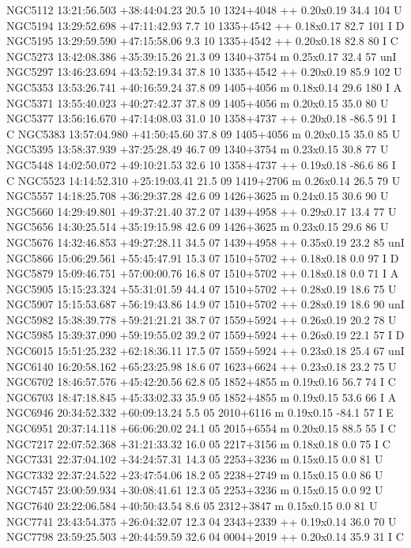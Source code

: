 NGC5112 13:21:56.503 +38:44:04.23 20.5 10 1324+4048 ++ 0.20x0.19 34.4 104 U 
NGC5194 13:29:52.698 +47:11:42.93 7.7 10 1335+4542 ++ 0.18x0.17 82.7 101 I D 
NGC5195 13:29:59.590 +47:15:58.06 9.3 10 1335+4542 ++ 0.20x0.18 82.8 80 I C 
NGC5273 13:42:08.386 +35:39:15.26 21.3 09 1340+3754 m 0.25x0.17 32.4 57 unI 
NGC5297 13:46:23.694 +43:52:19.34 37.8 10 1335+4542 ++ 0.20x0.19 85.9 102 U 
NGC5353 13:53:26.741 +40:16:59.24 37.8 09 1405+4056 m 0.18x0.14 29.6 180 I A 
NGC5371 13:55:40.023 +40:27:42.37 37.8 09 1405+4056 m 0.20x0.15 35.0 80 U 
NGC5377 13:56:16.670 +47:14:08.03 31.0 10 1358+4737 ++ 0.20x0.18 -86.5 91 I C 
NGC5383 13:57:04.980 +41:50:45.60 37.8 09 1405+4056 m 0.20x0.15 35.0 85 U 
NGC5395 13:58:37.939 +37:25:28.49 46.7 09 1340+3754 m 0.23x0.15 30.8 77 U 
NGC5448 14:02:50.072 +49:10:21.53 32.6 10 1358+4737 ++ 0.19x0.18 -86.6 86 I C 
NGC5523 14:14:52.310 +25:19:03.41 21.5 09 1419+2706 m 0.26x0.14 26.5 79 U 
NGC5557 14:18:25.708 +36:29:37.28 42.6 09 1426+3625 m 0.24x0.15 30.6 90 U 
NGC5660 14:29:49.801 +49:37:21.40 37.2 07 1439+4958 ++ 0.29x0.17 13.4 77 U 
NGC5656 14:30:25.514 +35:19:15.98 42.6 09 1426+3625 m 0.23x0.15 29.6 86 U 
NGC5676 14:32:46.853 +49:27:28.11 34.5 07 1439+4958 ++ 0.35x0.19 23.2 85 unI 
NGC5866 15:06:29.561 +55:45:47.91 15.3 07 1510+5702 ++ 0.18x0.18 0.0 97 I D 
NGC5879 15:09:46.751 +57:00:00.76 16.8 07 1510+5702 ++ 0.18x0.18 0.0 71 I A 
NGC5905 15:15:23.324 +55:31:01.59 44.4 07 1510+5702 ++ 0.28x0.19 18.6 75 U 
NGC5907 15:15:53.687 +56:19:43.86 14.9 07 1510+5702 ++ 0.28x0.19 18.6 90 unI 
NGC5982 15:38:39.778 +59:21:21.21 38.7 07 1559+5924 ++ 0.26x0.19 20.2 78 U 
NGC5985 15:39:37.090 +59:19:55.02 39.2 07 1559+5924 ++ 0.26x0.19 22.1 57 I D 
NGC6015 15:51:25.232 +62:18:36.11 17.5 07 1559+5924 ++ 0.23x0.18 25.4 67 unI 
NGC6140 16:20:58.162 +65:23:25.98 18.6 07 1623+6624 ++ 0.23x0.18 23.2 75 U 
NGC6702 18:46:57.576 +45:42:20.56 62.8 05 1852+4855 m 0.19x0.16 56.7 74 I C 
NGC6703 18:47:18.845 +45:33:02.33 35.9 05 1852+4855 m 0.19x0.15 53.6 66 I A 
NGC6946 20:34:52.332 +60:09:13.24 5.5 05 2010+6116 m 0.19x0.15 -84.1 57 I E 
NGC6951 20:37:14.118 +66:06:20.02 24.1 05 2015+6554 m 0.20x0.15 88.5 55 I C 
NGC7217 22:07:52.368 +31:21:33.32 16.0 05 2217+3156 m 0.18x0.18 0.0 75 I C 
NGC7331 22:37:04.102 +34:24:57.31 14.3 05 2253+3236 m 0.15x0.15 0.0 81 U 
NGC7332 22:37:24.522 +23:47:54.06 18.2 05 2238+2749 m 0.15x0.15 0.0 86 U 
NGC7457 23:00:59.934 +30:08:41.61 12.3 05 2253+3236 m 0.15x0.15 0.0 92 U 
NGC7640 23:22:06.584 +40:50:43.54 8.6 05 2312+3847 m 0.15x0.15 0.0 81 U 
NGC7741 23:43:54.375 +26:04:32.07 12.3 04 2343+2339 ++ 0.19x0.14 36.0 70 U 
NGC7798 23:59:25.503 +20:44:59.59 32.6 04 0004+2019 ++ 0.20x0.14 35.9 31 I C 










